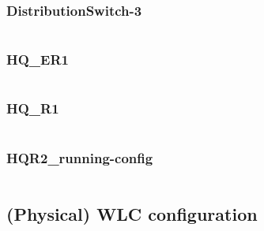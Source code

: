 \subsubsection{DistributionSwitch-3} \label{configwlc}
\inputminted[fontsize=\tiny,linenos,breaklines]{text}{./Config/HQ/DistributionSwitch-3.txt}
\subsubsection{HQ\_ER1} \label{configwlc}
\inputminted[fontsize=\tiny,linenos,breaklines]{text}{./Config/HQ/HQ-ER1.txt}
\subsubsection{HQ\_R1} \label{configwlc}
\inputminted[fontsize=\tiny,linenos,breaklines]{text}{./Config/HQ/HQ-R1.txt}
\subsubsection{HQR2\_running-config} \label{configwlc}
\inputminted[fontsize=\tiny,linenos,breaklines]{text}{./Config/HQ/HQR2-running-config.txt}

\subsection{(Physical) WLC configuration} \label{configwlc}
\inputminted[fontsize=\tiny,linenos,breaklines]{text}{./wirelessimplementation/wlc.cisco}




